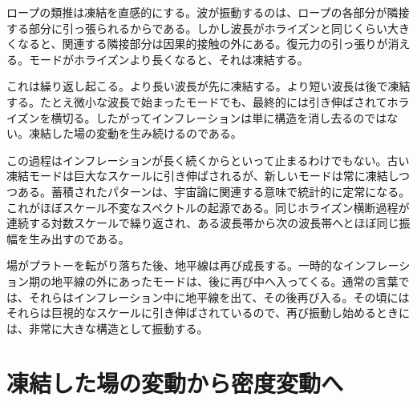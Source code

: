 ロープの類推は凍結を直感的にする。波が振動するのは、ロープの各部分が隣接する部分に引っ張られるからである。しかし波長がホライズンと同じくらい大きくなると、関連する隣接部分は因果的接触の外にある。復元力の引っ張りが消える。モードがホライズンより長くなると、それは凍結する。

これは繰り返し起こる。より長い波長が先に凍結する。より短い波長は後で凍結する。たとえ微小な波長で始まったモードでも、最終的には引き伸ばされてホライズンを横切る。したがってインフレーションは単に構造を消し去るのではない。凍結した場の変動を生み続けるのである。

この過程はインフレーションが長く続くからといって止まるわけでもない。古い凍結モードは巨大なスケールに引き伸ばされるが、新しいモードは常に凍結しつつある。蓄積されたパターンは、宇宙論に関連する意味で統計的に定常になる。これがほぼスケール不変なスペクトルの起源である。同じホライズン横断過程が連続する対数スケールで繰り返され、ある波長帯から次の波長帯へとほぼ同じ振幅を生み出すのである。

場がプラトーを転がり落ちた後、地平線は再び成長する。一時的なインフレーション期の地平線の外にあったモードは、後に再び中へ入ってくる。通常の言葉では、それらはインフレーション中に地平線を出て、その後再び入る。その頃にはそれらは巨視的なスケールに引き伸ばされているので、再び振動し始めるときには、非常に大きな構造として振動する。

\begin{classroomqa}
\end{classroomqa}

\begin{classroomqa}
\end{classroomqa}

\section{凍結した場の変動から密度変動へ}

